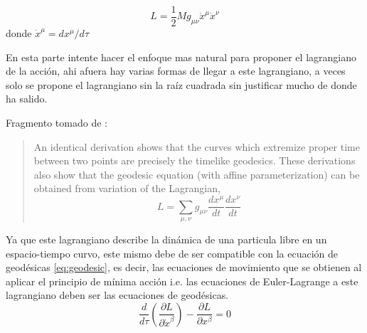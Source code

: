 \begin{equation}
    L = \frac{1}{2} M g_{\mu \nu} \dot{x}^\mu \dot{x}^\nu 
\end{equation}
donde $\dot{x}^\mu = dx^\mu / d\tau$
\begin{note}
     En esta parte intente hacer el enfoque mas natural para proponer el lagrangiano de la acción, ahi afuera hay varias formas de llegar a este lagrangiano, a veces solo se propone el lagrangiano sin la raíz cuadrada sin justificar mucho de donde ha salido.

    Fragmento tomado de \cite[ver p. 45]{wald-1984}:
            \begin{quote}
                 An identical derivation shows that the curves which extremize proper time between two points are precisely the timelike geodesics. These derivations also show that the geodesic equation (with affine parameterization) can be obtained from variation of the Lagrangian,
                 $$
                 L=\sum_{\mu, \nu} g_{\mu \nu} \frac{d x^\mu}{d t} \frac{d x^\nu}{d t}
                 $$
    \end{quote}
\end{note}

Ya que este lagrangiano describe la dinámica de una particula libre en un espacio-tiempo curvo, este mismo debe de ser compatible con la ecuación de geodésicas \ref{eq:geodesic}, es decir, las ecuaciones de movimiento que se obtienen al aplicar el principio de mínima acción i.e. las ecuaciones de Euler-Lagrange a este lagrangiano deben ser las ecuaciones de geodésicas.
\begin{equation}
    \frac{d}{d\tau} \left( \frac{\partial L}{\partial \dot{x}^\beta} \right) - \frac{\partial L}{\partial x^\beta} = 0
\end{equation}

